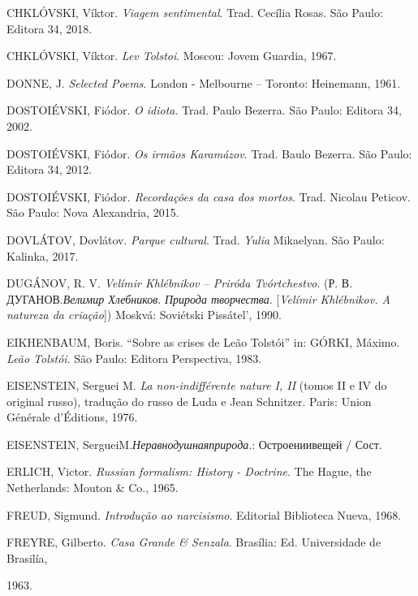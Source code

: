 {{{CHKLÓVSKI, Víktor. \emph{Viagem sentimental}. Trad. Cecília Rosas. São
Paulo: Editora 34, 2018.

CHKLÓVSKI, Víktor. \emph{Lev Tolstoi}. Moscou: Jovem Guardia, 1967.

DONNE, J. \emph{Selected Poems}. London - Melbourne -- Toronto:
Heinemann, 1961.

DOSTOIÉVSKI, Fiódor. \emph{O idiota}. Trad. Paulo Bezerra. São Paulo:
Editora 34, 2002.

DOSTOIÉVSKI, Fiódor. \emph{Os irmãos Karamázov}. Trad. Baulo Bezerra.
São Paulo: Editora 34, 2012.

DOSTOIÉVSKI, Fiódor\emph{. Recordações da casa dos mortos}. Trad.
Nicolau Peticov. São Paulo: Nova Alexandria, 2015.

DOVLÁTOV, Dovlátov. \emph{Parque cultural}. Trad.
\emph{Yulia} Mikaelyan. São Paulo: Kalinka, 2017.

DUGÁNOV, R. V. \emph{Velímir Khlébnikov -- Priróda Tvórtchestvo}. (Р. В.
ДУГАНОВ.\emph{Велимир Хлебников}. \emph{Природа творчества}.
{[}\emph{Velímir Khlébnikov. A natureza da criação}{]}) Moskvá:
Soviétski Pissátel', 1990.

EIKHENBAUM, Boris. ``Sobre as crises de Leão Tolstói'' in: GÓRKI,
Máximo. \emph{Leão Tolstói}. São Paulo: Editora Perspectiva, 1983.

EISENSTEIN, Serguei M. \emph{La non-indifférente nature I, II} (tomos II
e IV do original russo), tradução do russo de Luda e Jean Schnitzer.
Paris: Union Générale d'Éditions, 1976.

EISENSTEIN, SergueiM.\emph{Неравнодушнаяприрода}.: Остроениивещей /
Сост.

ERLICH, Victor. \emph{Russian formalism: History - Doctrine}. The Hague,
the Netherlands: Mouton \& Co., 1965.

FREUD, Sigmund. \emph{Introdução ao narcisismo}. Editorial Biblioteca
Nueva, 1968.

FREYRE, Gilberto. \emph{Casa Grande \& Senzala}. Brasília: Ed.
Universidade de Brasilía,

1963.

}}}

